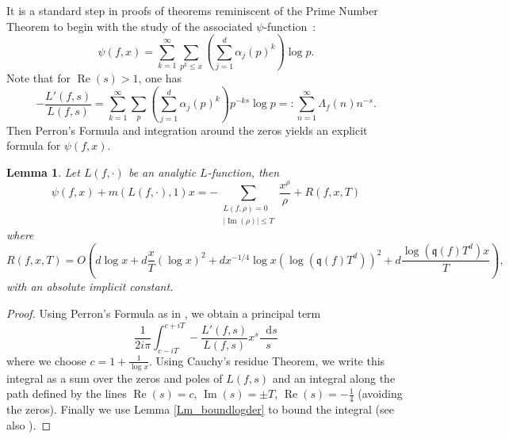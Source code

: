 \documentclass[a4paper,10pt]{amsart}
\theoremstyle{plain}
\newtheorem{lem}[theo]{Lemma}
\theoremstyle{definition}
\begin{document}
It is a standard step in proofs of theorems reminiscent of the Prime Number Theorem 
to begin with the study of the associated $\psi$-function~:
$$\psi(f,x) = \sum_{k=1}^{\infty}\sum_{p^{k}\leq x}\left(\sum_{j=1}^{d} \alpha_{j}(p)^k\right) \log p.$$
Note that for $\operatorname{Re}(s)>1$, one has
$$-\frac{L'(f,s)}{L(f,s)} = \sum_{k=1}^{\infty}\sum_{p}\left(\sum_{j=1}^{d} \alpha_{j}(p)^k\right)p^{-ks} \log p=: \sum_{n=1}^{\infty}\Lambda_{f}(n)n^{-s}.$$
Then Perron's Formula and integration around the zeros yields an explicit formula for $\psi(f,x)$.
\begin{lem}\label{Lm_ExplicitFomula}
Let $L(f,\cdot)$ be an analytic $L$-function, then
$$\psi(f,x) + m(L(f,\cdot),1)x = - \sum_{\substack {L(f,\rho)=0 \\ \lvert\operatorname{Im}(\rho)\rvert\leq T}}\frac{x^{\rho}}{\rho} + R(f,x,T)$$
where $$R(f,x,T)= O\left(d\log x + d\frac{x}{T}(\log x)^2 
+ dx^{-1/4} \log x  \left(\log(\mathfrak{q}(f)T^{d})\right)^{2} + 
d\frac{\log(\mathfrak{q}(f)T^{d})x}{T} \right),$$
with an absolute implicit constant.
\end{lem}

\begin{proof}
Using Perron's Formula as in \cite[Cor. 5.3]{MV},
we obtain a principal term 
$$\frac{1}{2i\pi}\int_{c-iT}^{c+iT} -\frac{L'(f,s)}{L(f,s)} x^{s}\frac{{\mathop{}\!\mathrm{d}} s}{s}$$
where we choose $c=1+\frac{1}{\log x}$.
Using Cauchy's residue Theorem, 
we write this integral as a sum over the zeros and poles of $L(f,s)$ and an integral along the path defined by the lines $\operatorname{Re}(s) = c$, $\operatorname{Im}(s) = \pm T$, $\operatorname{Re}(s) = -\frac{1}{4}$  (avoiding the zeros).
Finally we use Lemma \ref{Lm_boundlogder} to bound the integral 
(see also \cite[Chap. 5, Ex. 7]{IK}).
\end{proof}
\end{document}
